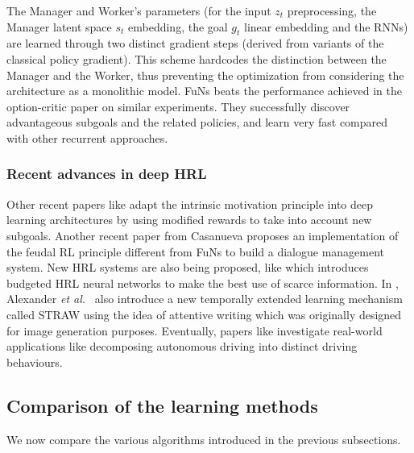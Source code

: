 \documentclass{article}
\newcommand{\etal}{\textit{et al.}}
\begin{document}
The Manager and Worker's parameters (for the input $z_t$ preprocessing, the Manager latent space $s_t$ embedding, the goal $g_t$ linear embedding and the RNNs) are learned through two distinct gradient steps (derived from variants of the classical policy gradient). This scheme hardcodes the distinction between the Manager and the Worker, thus preventing the optimization from considering the architecture as a monolithic model.
FuNs beats the performance achieved in the option-critic paper \cite{bacon_option-critic_2016} on similar experiments. They successfully discover advantageous subgoals and the related policies, and learn very fast compared with other recurrent approaches.

\subsubsection{Recent advances in deep HRL}

Other recent papers like \cite{kulkarni_hierarchical_2016, florensa_stochastic_2017} adapt the intrinsic motivation principle into deep learning architectures by using modified rewards to take into account new subgoals. Another recent paper from Casanueva \cite{casanueva_feudal_2018} proposes an implementation of the feudal RL principle different from FuNs to build a dialogue management system. New HRL systems are also being proposed, like \cite{budgeted_hrl} which introduces budgeted HRL neural networks to make the best use of scarce information. In \cite{alexander_strategic_2016}, Alexander \etal~ also introduce a new temporally extended learning mechanism called STRAW using the idea of attentive writing which was originally designed for image generation purposes. Eventually, papers like \cite{chen2018deep} investigate real-world applications like decomposing autonomous driving into distinct driving behaviours.

\subsection{Comparison of the learning methods}

We now compare the various algorithms introduced in the previous subsections.
\end{document}
